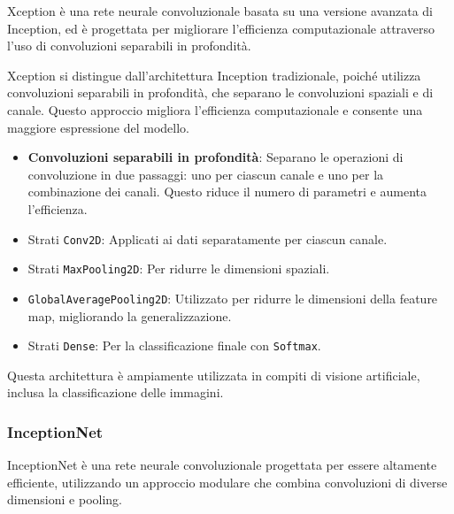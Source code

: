 Xception è una rete neurale convoluzionale basata su una versione avanzata di Inception, ed è progettata per migliorare l'efficienza computazionale attraverso l'uso di convoluzioni separabili in profondità.

Xception si distingue dall'architettura Inception tradizionale, poiché utilizza convoluzioni separabili in profondità, che separano le convoluzioni spaziali e di canale. Questo approccio migliora l'efficienza computazionale e consente una maggiore espressione del modello.
\begin{itemize}
    \item \textbf{Convoluzioni separabili in profondità}: Separano le operazioni di convoluzione in due passaggi: uno per ciascun canale e uno per la combinazione dei canali. Questo riduce il numero di parametri e aumenta l'efficienza.
    \item Strati \texttt{Conv2D}: Applicati ai dati separatamente per ciascun canale.
    \item Strati \texttt{MaxPooling2D}: Per ridurre le dimensioni spaziali.
    \item \texttt{GlobalAveragePooling2D}: Utilizzato per ridurre le dimensioni della feature map, migliorando la generalizzazione.
    \item Strati \texttt{Dense}: Per la classificazione finale con \texttt{Softmax}.
\end{itemize}
Questa architettura è ampiamente utilizzata in compiti di visione artificiale, inclusa la classificazione delle immagini.

\subsubsection{InceptionNet}

InceptionNet è una rete neurale convoluzionale progettata per essere altamente efficiente, utilizzando un approccio modulare che combina convoluzioni di diverse dimensioni e pooling.

